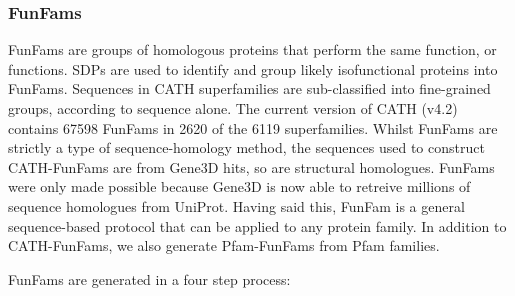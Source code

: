 \subsubsection{FunFams}
\label{sec:intro-funfam}

FunFams are groups of homologous proteins that perform the same function, or functions. SDPs are used to identify and group likely isofunctional proteins into FunFams. Sequences in CATH superfamilies are sub-classified into fine-grained groups, according to sequence alone. The current version of CATH (v4.2) contains \num{67598} FunFams in \num{2620} of the \num{6119} superfamilies. Whilst FunFams are strictly a type of sequence-homology method, the sequences used to construct CATH-FunFams are from Gene$3$D hits, so are structural homologues. FunFams were only made possible because Gene$3$D is now able to retreive millions of sequence homologues from UniProt. Having said this, FunFam is a general sequence-based protocol that can be applied to any protein family. In addition to CATH-FunFams, we also generate Pfam-FunFams from Pfam families. 

FunFams are generated in a four step process:

